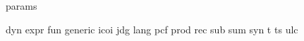 {params}

{dyn}
{expr}
{fun}
{generic}
{icoi}
{jdg}
{lang}
{pcf}
{prod}
{rec}
{sub}
{sum}
{syn}
{t}
{ts}
{ulc}